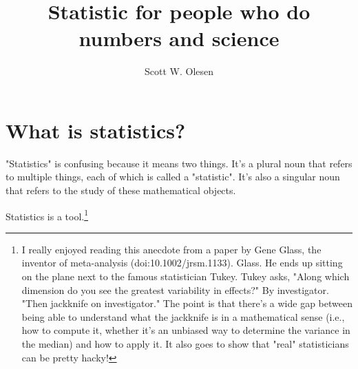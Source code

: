 \documentclass{book}
\title{Statistic for people who do numbers and science}
\author{Scott W. Olesen}
\begin{document}
\maketitle

\frontmatter



\mainmatter

\chapter{What is statistics?}

"Statistics" is confusing because it means two things. It's a plural noun that
refers to multiple things, each of which is called a "statistic". It's also a
singular noun that refers to the study of these mathematical objects.

Statistics is a tool.\footnote{I really enjoyed reading this anecdote from a
paper by Gene Glass, the inventor of meta-analysis (doi:10.1002/jrsm.1133).
Glass. He ends up sitting on the plane next to the famous statistician
Tukey. Tukey asks, "Along which dimension do you see the greatest
variability in effects?" By investigator. "Then jackknife on investigator."
The point is that there's a wide gap between being able to understand what
the jackknife is in a mathematical sense (i.e., how to compute it, whether
it's an unbiased way to determine the variance in the median) and how to apply
it. It also goes to show that "real" statisticians can be pretty hacky!}
\end{document}
